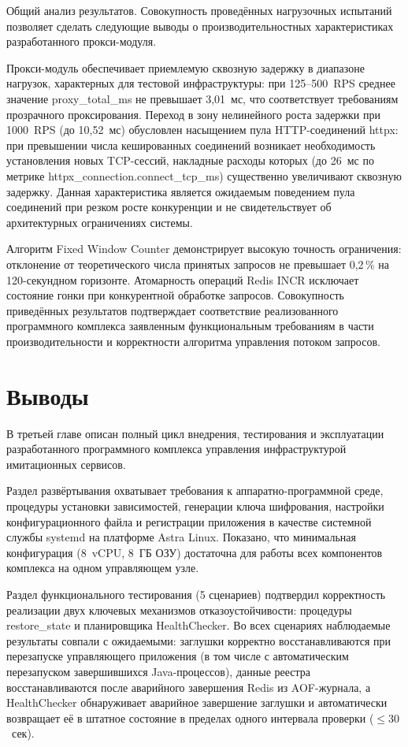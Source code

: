 Общий анализ результатов. Совокупность проведённых нагрузочных испытаний позволяет сделать следующие выводы о производительностных характеристиках разработанного прокси-модуля.

Прокси-модуль обеспечивает приемлемую сквозную задержку в диапазоне нагрузок, характерных для тестовой инфраструктуры: при 125--500~RPS среднее значение proxy\_total\_ms не превышает 3,01~мс, что соответствует требованиям прозрачного проксирования. Переход в зону нелинейного роста задержки при 1000~RPS (до 10,52~мс) обусловлен насыщением пула HTTP-соединений httpx: при превышении числа кешированных соединений возникает необходимость установления новых TCP-сессий, накладные расходы которых (до 26~мс по метрике httpx\_connection.connect\_tcp\_ms) существенно увеличивают сквозную задержку. Данная характеристика является ожидаемым поведением пула соединений при резком росте конкуренции и не свидетельствует об архитектурных ограничениях системы.

Алгоритм Fixed Window Counter демонстрирует высокую точность ограничения: отклонение от теоретического числа принятых запросов не превышает 0,2\,\% на 120-секундном горизонте. Атомарность операций Redis INCR исключает состояние гонки при конкурентной обработке запросов. Совокупность приведённых результатов подтверждает соответствие реализованного программного комплекса заявленным функциональным требованиям в части производительности и корректности алгоритма управления потоком запросов.

\section{Выводы}

В третьей главе описан полный цикл внедрения, тестирования и эксплуатации разработанного программного комплекса управления инфраструктурой имитационных сервисов.

Раздел развёртывания охватывает требования к аппаратно-программной среде, процедуры установки зависимостей, генерации ключа шифрования, настройки конфигурационного файла и регистрации приложения в качестве системной службы systemd на платформе Astra Linux. Показано, что минимальная конфигурация (8~vCPU, 8~ГБ ОЗУ) достаточна для работы всех компонентов комплекса на одном управляющем узле.

Раздел функционального тестирования (5 сценариев) подтвердил корректность реализации двух ключевых механизмов отказоустойчивости: процедуры restore\_state и планировщика HealthChecker. Во всех сценариях наблюдаемые результаты совпали с ожидаемыми: заглушки корректно восстанавливаются при перезапуске управляющего приложения (в том числе с автоматическим перезапуском завершившихся Java-процессов), данные реестра восстанавливаются после аварийного завершения Redis из AOF-журнала, а HealthChecker обнаруживает аварийное завершение заглушки и автоматически возвращает её в штатное состояние в пределах одного интервала проверки ($\leq 30$~сек).

